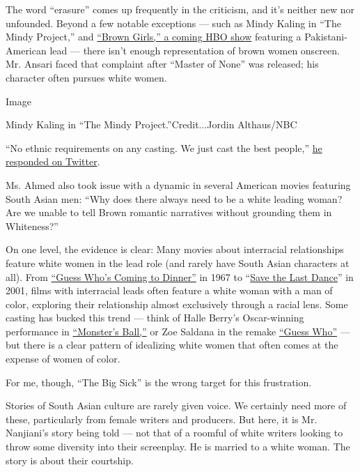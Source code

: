 The word ``erasure'' comes up frequently in the criticism, and it's
neither new nor unfounded. Beyond a few notable exceptions --- such as
Mindy Kaling in ``The Mindy Project,'' and
\href{https://www.theatlantic.com/entertainment/archive/2017/07/all-the-brown-girls-on-tv/530184/}{``Brown
Girls,'' a coming HBO show} featuring a Pakistani-American lead ---
there isn't enough representation of brown women onscreen. Mr. Ansari
faced that complaint after ``Master of None'' was released; his
character often pursues white women.

Image

Mindy Kaling in ``The Mindy Project.''Credit...Jordin Althaus/NBC

``No ethnic requirements on any casting. We just cast the best people,''
\href{https://twitter.com/azizansari?ref_src=twsrc\%5Etfw\&ref_url=http\%3A\%2F\%2Fwww.papermag.com\%2Faziz-ansari-master-of-none-1449383127.html}{he
responded on Twitter}.

Ms. Ahmed also took issue with a dynamic in several American movies
featuring South Asian men: ``Why does there always need to be a white
leading woman? Are we unable to tell Brown romantic narratives without
grounding them in Whiteness?''

On one level, the evidence is clear: Many movies about interracial
relationships feature white women in the lead role (and rarely have
South Asian characters at all). From
\href{http://www.nytimes.com/movie/review?res=9C03E6DE1430E23BBC4A52DFB467838C679EDE}{``Guess
Who's Coming to Dinner''} in 1967 to
``\href{http://www.nytimes.com/movie/review?res=9901E7DC1F3AF931A25752C0A9679C8B63}{Save
the Last Dance}'' in 2001, films with interracial leads often feature a
white woman with a man of color, exploring their relationship almost
exclusively through a racial lens. Some casting has bucked this trend
--- think of Halle Berry's Oscar-winning performance in
\href{http://www.nytimes.com/2001/12/26/movies/film-review-courtesy-and-decency-play-sneaky-with-a-tough-guy.html}{``Monster's
Ball,''} or Zoe Saldana in the remake
\href{http://www.nytimes.com/2005/03/25/movies/shedding-racial-prejudices-but-not-old-ideas-of-virtue.html}{``Guess
Who''} --- but there is a clear pattern of idealizing white women that
often comes at the expense of women of color.

For me, though, ``The Big Sick'' is the wrong target for this
frustration.

Stories of South Asian culture are rarely given voice. We certainly need
more of these, particularly from female writers and producers. But here,
it is Mr. Nanjiani's story being told --- not that of a roomful of white
writers looking to throw some diversity into their screenplay. He is
married to a white woman. The story is about their courtship.

